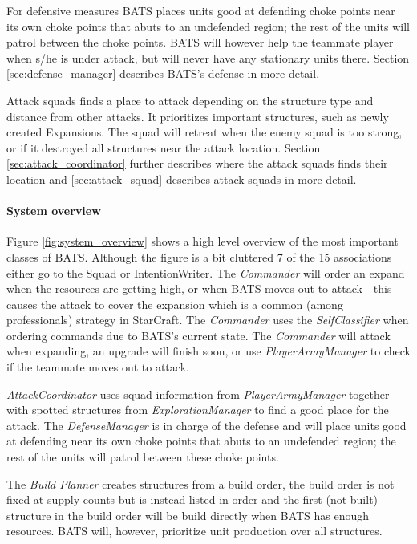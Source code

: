 For defensive measures BATS places units good at defending choke points near its own choke points that abuts to an undefended region; the rest of the units will patrol between the choke points. BATS will however help the teammate player when s/he is under attack, but will never have any stationary units there. Section \ref{sec:defense_manager}  describes BATS's defense in more detail.

Attack squads finds a place to attack depending on the structure type and distance from other attacks. It prioritizes important structures, such as newly created Expansions. The squad will retreat when the enemy squad is too strong, or if it destroyed all structures near the attack location. Section \ref{sec:attack_coordinator}  further describes where the attack squads finds their location and \ref{sec:attack_squad}  describes attack squads in more detail.

\paragraph{System overview}
Figure \ref{fig:system_overview} shows a high level overview of the most important classes of BATS. Although the figure is a bit cluttered 7 of the 15 associations either go to the Squad or IntentionWriter. The \emph{Commander} will order an expand when the resources are getting high, or when BATS moves out to attack—this causes the attack to cover the expansion which is a common (among professionals) strategy in StarCraft\cite{day9}. The \emph{Commander} uses the \emph{SelfClassifier} when ordering commands due to BATS's current state. The \emph{Commander} will attack when expanding, an upgrade will finish soon, or use \emph{PlayerArmyManager} to check if the teammate moves out to attack.

\emph{AttackCoordinator} uses squad information from \emph{PlayerArmyManager} together with spotted structures from \emph{ExplorationManager} to find a good place for the attack. The \emph{DefenseManager} is in charge of the defense and will place units good at defending near its own choke points that abuts to an undefended region; the rest of the units will patrol between these choke points.

The \emph{Build Planner} creates structures from a build order, the build order is not fixed at supply counts but is instead listed in order and the first (not built) structure in the build order will be build directly when BATS has enough resources. BATS will, however, prioritize unit production over all structures.

